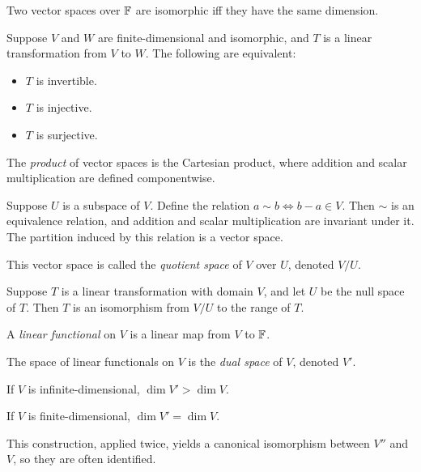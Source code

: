 \begin{prop}
  Two vector spaces over $\mathbb{F}$ are isomorphic iff they have
  the same dimension.
\end{prop}
\begin{prop}
  Suppose $V$ and $W$ are finite-dimensional and isomorphic,
  and $T$ is a linear transformation from $V$
  to $W$. The following are equivalent:
  \begin{itemize}
    \item $T$ is invertible.
    \item $T$ is injective.
    \item $T$ is surjective.
  \end{itemize}
\end{prop}
\begin{defn}
  The \emph{product} of vector spaces is the Cartesian product, where addition
  and scalar multiplication are defined componentwise.
\end{defn}
\begin{prop}
  Suppose $U$ is a subspace of $V$. Define the relation $a\sim b\iff b-a\in V$.
  Then $\sim$ is an equivalence relation, and addition and scalar multiplication
  are invariant under it. The partition induced by this relation is a vector
  space.
\end{prop}
\begin{defn}
  This vector space is called the \emph{quotient space} of $V$ over $U$, denoted
  $V/U$.
\end{defn}
\begin{prop}
  Suppose $T$ is a linear transformation with domain $V$, and let $U$ be the null space of $T$.
  Then $T$ is an isomorphism from $V/U$ to the range of $T$.
\end{prop}
\begin{defn}
  A \emph{linear functional} on $V$ is a linear map from $V$ to $\mathbb{F}$.
\end{defn}
\begin{defn}
  The space of linear functionals on $V$ is the \emph{dual space} of $V$,
  denoted $V'$.
\end{defn}
\begin{prop}
  If $V$ is infinite-dimensional, $\dim V'>\dim V$.
\end{prop}
\begin{prop}
  If $V$ is finite-dimensional, $\dim V'=\dim V$.
\end{prop}
\begin{rem}
  This construction, applied twice, yields a canonical isomorphism between $V''$
  and $V$, so they are often identified.
\end{rem}
